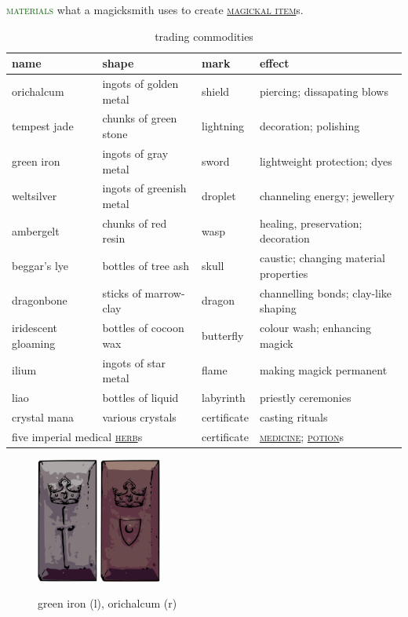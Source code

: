 \documentclass[twoside,11pt,b5paper,twocolumn]{scrbook}
\newcommand{\estcab}[1]{\textsc{\textcolor{marron}{#1}}}
\newcommand{\keyword}[1]{\textcolor{darkgreen}{#1}}
\renewcommand{\paragraph}[1]{\par\noindent\markboth{#1}{#1}\estcab{\keyword{#1}}\label{#1} }
\newcommand{\see}[1]{{\estcab{\hyperref[#1]{#1}}}}
\begin{document}
\paragraph{materials} what a magicksmith uses to create \see{magickal item}s. \begin{table}\begin{tabular}{lllp{}}name& shape&mark&effect\\\hline orichalcum&ingots of golden metal & shield& piercing; dissapating blows \\ tempest jade & chunks of green stone & lightning & decoration; polishing \\ green iron & ingots of gray metal & sword & lightweight protection; dyes \\ weltsilver & ingots of greenish metal & droplet & channeling energy; jewellery \\ ambergelt & chunks of red resin & wasp & healing, preservation; decoration \\ beggar's lye & bottles of tree ash & skull & caustic; changing material properties \\ dragonbone & sticks of marrow-clay & dragon & channelling bonds; clay-like shaping \\ iridescent gloaming & bottles of cocoon wax & butterfly & colour wash; enhancing magick \\ ilium & ingots of star metal & flame & making magick permanent \\ liao & bottles of liquid & labyrinth & priestly ceremonies \\ crystal mana & various crystals & certificate & casting rituals \\ \multicolumn{2}{l}{five imperial medical \see{herb}s} & certificate & \see{medicine}; \see{potion}s \end{tabular}\caption{trading commodities}\end{table} \begin{figure}\centering\includegraphics[width=2cm]{encyclopedia/greeniron} \quad \includegraphics[width=2cm]{encyclopedia/orichalcum}\caption{green iron (l), orichalcum (r)}\end{figure}
\end{document}
